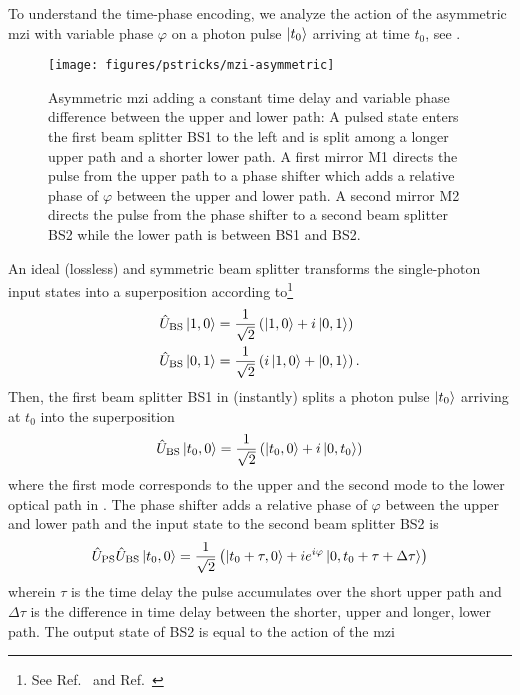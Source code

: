 To understand the time-phase encoding, we analyze the action of the asymmetric \gls{mzi} with variable phase $\varphi$ on a photon pulse $\ket{t_0}$ arriving at time $t_0$, see .
\begin{figure}[htb]
    \centering
    \texttt{[image: figures/pstricks/mzi-asymmetric]}
     \caption{Asymmetric \gls{mzi} adding a constant time delay and variable phase difference between the upper and lower path: A pulsed state enters the first beam splitter BS1 to the left and is split among a longer upper path and a shorter lower path. A first mirror M1 directs the pulse from the upper path to a phase shifter which adds a relative phase of $\varphi$ between the upper and lower path. A second mirror M2 directs the pulse from the phase shifter to a second beam splitter BS2 while the lower path is between BS1 and BS2.}\label{fig:mzi_asymmetric}
\end{figure}
An ideal (lossless) and symmetric beam splitter transforms the single-photon input states into a superposition according to\footnote{See Ref.~\cite[p.~137]{Haroche2006} and Ref.~\cite[p.~143]{Gerry2005}}
\begin{align}
	\hat{U}_\text{BS}
	\ket{1,0}
	&=
	\frac{1}{\sqrt{2}}
	\left(\ket{1,0}+i\ket{0,1}\right)
	\\
	\hat{U}_\text{BS}
	\ket{0,1}
	&=
	\frac{1}{\sqrt{2}}
	\left(i\ket{1,0}+\ket{0,1}\right)
	.
\end{align}
Then, the first beam splitter BS1 in  (instantly) splits a photon pulse $\ket{t_0}$ arriving at $t_0$ into the superposition
\begin{equation}
	\hat{U}_\text{BS}
	\ket{t_0,0}
	=
	\frac{1}{\sqrt{2}}
	\left(\ket{t_0,0}+i\ket{0,t_0}\right)
\end{equation}
where the first mode corresponds to the upper and the second mode to the lower optical path in .
The phase shifter adds a relative phase of $\varphi$ between the upper and lower path and the input state to the second beam splitter BS2 is
\begin{equation}
	\hat{U}_\text{PS}
	\hat{U}_\text{BS}
	\ket{t_0,0}
	=
	\frac{1}{\sqrt{2}}
	\left(
		\ket{t_0+\tau,0}
		+
		ie^{i\varphi}
		\ket{0,t_0+\tau+\Delta\tau}
	\right)
\end{equation}
wherein $\tau$ is the time delay the pulse accumulates over the short upper path and $\Delta\tau$ is the difference in time delay between the shorter, upper and longer, lower path.
The output state of BS2 is equal to the action of the \gls{mzi}
